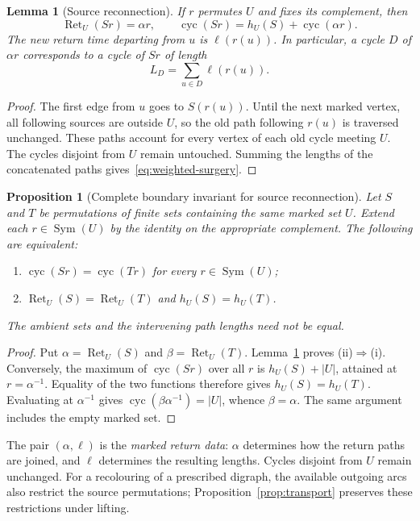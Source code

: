\documentclass[11pt,reqno]{amsart}
\numberwithin{equation}{section}
\newtheorem{lemma}[theorem]{Lemma}
\newtheorem{proposition}[theorem]{Proposition}
\theoremstyle{definition}
\theoremstyle{remark}
\newcommand{\cyc}{\operatorname{cyc}}
\newcommand{\Ret}{\operatorname{Ret}}
\newcommand{\Sym}{\operatorname{Sym}}
\begin{document}
\begin{lemma}[Source reconnection]\label{lem:surgery}
If $r$ permutes $U$ and fixes its complement, then
\begin{equation}\label{eq:surgery}
 \Ret_U(Sr)=\alpha r,\qquad
 \cyc(Sr)=h_U(S)+\cyc(\alpha r).
\end{equation}
The new return time departing from $u$ is $\ell(r(u))$. In particular, a cycle
$D$ of $\alpha r$ corresponds to a cycle of $Sr$ of length
\begin{equation}\label{eq:weighted-surgery}
 L_D=\sum_{u\in D}\ell(r(u)).
\end{equation}
\end{lemma}
\begin{proof}
The first edge from $u$ goes to $S(r(u))$. Until the next marked vertex, all
following sources are outside $U$, so the old path following $r(u)$ is traversed
unchanged. These paths account for every vertex of each old cycle meeting $U$.
The cycles disjoint from $U$ remain untouched. Summing the lengths of the
concatenated paths gives~\eqref{eq:weighted-surgery}.
\end{proof}

\begin{proposition}[Complete boundary invariant for source reconnection]\label{prop:boundary-complete}
Let $S$ and $T$ be permutations of finite sets containing the same marked
set $U$. Extend each $r\in\Sym(U)$ by the identity on the appropriate
complement. The following are equivalent:
\begin{enumerate}
\item $\cyc(Sr)=\cyc(Tr)$ for every $r\in\Sym(U)$;
\item $\Ret_U(S)=\Ret_U(T)$ and $h_U(S)=h_U(T)$.
\end{enumerate}
The ambient sets and the intervening path lengths need not be equal.
\end{proposition}
\begin{proof}
Put $\alpha=\Ret_U(S)$ and $\beta=\Ret_U(T)$.
Lemma~\ref{lem:surgery} proves (ii)$\Rightarrow$(i).
Conversely, the maximum of $\cyc(Sr)$ over all $r$ is $h_U(S)+|U|$,
attained at $r=\alpha^{-1}$. Equality of the two functions therefore gives
$h_U(S)=h_U(T)$. Evaluating at $\alpha^{-1}$ gives
$\cyc(\beta\alpha^{-1})=|U|$, whence $\beta=\alpha$.
The same argument includes the empty marked set.
\end{proof}

The pair $(\alpha,\ell)$ is the \emph{marked return data}: $\alpha$
determines how the return paths are joined, and $\ell$ determines the
resulting lengths. Cycles disjoint from $U$ remain unchanged. For a
recolouring of a prescribed digraph, the available outgoing arcs also
restrict the source permutations; Proposition~\ref{prop:transport}
preserves these restrictions under lifting.
\end{document}
